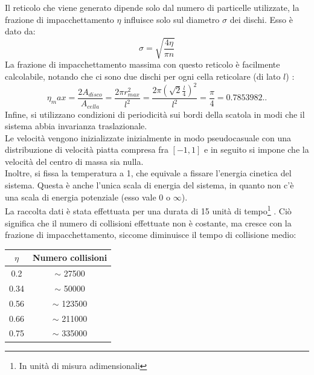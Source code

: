 Il reticolo che viene generato dipende solo dal numero di particelle utilizzate, la frazione di impacchettamento $\eta$ influisce solo sul diametro $\sigma$ dei dischi. Esso è dato da:
$$
	\sigma = \sqrt{\frac{4 \eta}{ \pi n}}
$$
La frazione di impacchettamento massima con questo reticolo è facilmente calcolabile, notando che ci sono due dischi per ogni cella reticolare (di lato $l$) :
$$
	\eta_max = \frac{ 2 A_{disco}}{A_{cella}} = \frac{2 \pi r_{max}^2}{l^2} = \frac{2 \pi (\sqrt{2} \frac{l}{4})^2}{l^2} = \frac{\pi}{4} = 0.7853982..
$$
Infine, si utilizzano condizioni di periodicità sui bordi della scatola in modi che il sistema abbia invarianza traslazionale.\\
Le velocità vengono inizializzate inizialmente in modo pseudocasuale con una distribuzione di velocità piatta compresa fra $[-1,1]$ e in seguito si impone che la velocità del centro di massa sia nulla.\\
Inoltre, si fissa la temperatura a 1, che equivale a fissare l'energia cinetica del sistema.
Questa è anche l'unica scala di energia del sistema, in quanto non c'è una scala di energia potenziale (esso vale $0$ o $\infty$).\\
La raccolta dati è stata effettuata per una durata di 15 unità di tempo\footnote{In unità di misura adimensionali} . Ciò significa che il numero di collisioni effettuate non è costante, ma cresce con la frazione di impacchettamento, siccome diminuisce il tempo di collisione medio:
\begin{center}

\begin{tabular}{c c}
\toprule
	$\eta$ & Numero collisioni \\
	\midrule
	0.2 & $\sim$ 27500 \\
	0.34 & $\sim$ 50000 \\
	0.56 & $\sim$ 123500 \\
	0.66 & $\sim$ 211000 \\
	0.75 & $\sim$ 335000 \\
	\bottomrule
\end{tabular}
\end{center}

